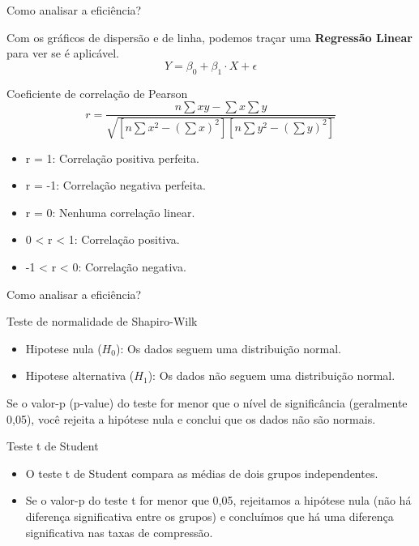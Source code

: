 \documentclass{beamer}
\begin{document}
    \begin{frame}{Como analisar a eficiência?}

        Com os gráficos de dispersão e de linha, podemos traçar uma \textbf{Regressão Linear} para ver se é
        aplicável.
        \[
        Y = \beta_0 + \beta_1 \cdot X + \epsilon
        \]

       \begin{block}{Coeficiente de correlação de Pearson}
           \[
                r = \frac{n \sum{xy} - \sum{x} \sum{y}}{\sqrt{[n \sum{x^2} - (\sum{x})^2] [n \sum{y^2} - (\sum{y})^2]}}
           \]
           \begin{itemize}
                \item r = 1: Correlação positiva perfeita.
                \item r = -1: Correlação negativa perfeita.
                \item r = 0: Nenhuma correlação linear.
                \item 0 < r < 1: Correlação positiva.
                \item -1 < r < 0: Correlação negativa.
           \end{itemize}
       \end{block}
    \end{frame}

    \begin{frame}{Como analisar a eficiência?}
        \begin{block}{Teste de normalidade de Shapiro-Wilk}
            \begin{itemize}
                \item Hipotese nula (\(H_0\)): Os dados seguem uma distribuição normal.
                \item Hipotese alternativa (\(H_1\)): Os dados não seguem uma distribuição normal.
            \end{itemize}
            Se o valor-p (p-value) do teste for menor que o nível de significância (geralmente 0,05), você rejeita a hipótese nula e conclui que os dados não são normais.
        \end{block}

        \begin{block}{Teste t de Student}
            \begin{itemize}
            \item O teste t de Student compara as médias de dois grupos independentes.
            \item Se o valor-p do teste t for menor que 0,05, rejeitamos a hipótese nula (não há diferença significativa entre os grupos) e concluímos que há uma diferença significativa nas taxas de compressão.
            \end{itemize}
        \end{block}
    \end{frame}
\end{document}
